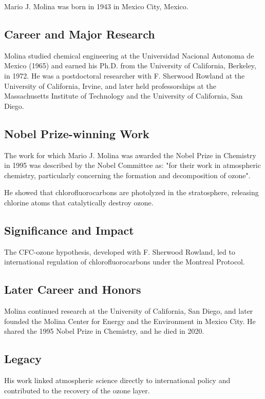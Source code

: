 Mario J. Molina was born in 1943 in Mexico City, Mexico.

\subsection*{Career and Major Research}

Molina studied chemical engineering at the Universidad Nacional Autonoma de Mexico (1965) and earned his Ph.D. from the University of California, Berkeley, in 1972. He was a postdoctoral researcher with F. Sherwood Rowland at the University of California, Irvine, and later held professorships at the Massachusetts Institute of Technology and the University of California, San Diego.

\subsection*{Nobel Prize-winning Work}

The work for which Mario J. Molina was awarded the Nobel Prize in Chemistry in 1995 was described by the Nobel Committee as: "for their work in atmospheric chemistry, particularly concerning the formation and decomposition of ozone".

He showed that chlorofluorocarbons are photolyzed in the stratosphere, releasing chlorine atoms that catalytically destroy ozone.

\subsection*{Significance and Impact}

The CFC-ozone hypothesis, developed with F. Sherwood Rowland, led to international regulation of chlorofluorocarbons under the Montreal Protocol.

\subsection*{Later Career and Honors}

Molina continued research at the University of California, San Diego, and later founded the Molina Center for Energy and the Environment in Mexico City. He shared the 1995 Nobel Prize in Chemistry, and he died in 2020.

\subsection*{Legacy}

His work linked atmospheric science directly to international policy and contributed to the recovery of the ozone layer.


